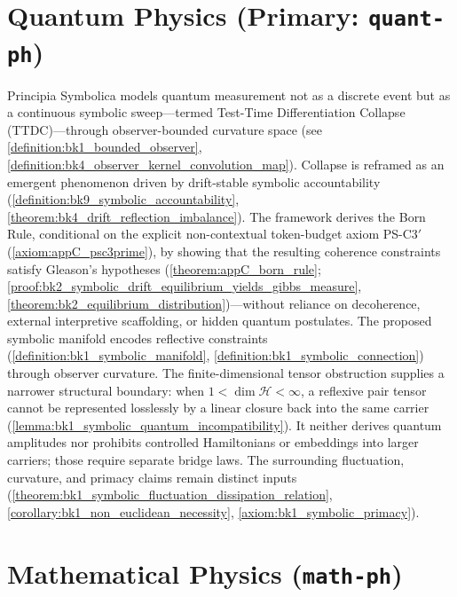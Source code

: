 \section*{Quantum Physics (Primary: \texttt{quant-ph})}
\label{sec:appE_quantum_physics}
Principia Symbolica models quantum measurement not as a discrete event but as a continuous symbolic sweep—termed Test-Time Differentiation Collapse (TTDC)—through observer-bounded curvature space (see \ref{definition:bk1_bounded_observer}, \ref{definition:bk4_observer_kernel_convolution_map}). Collapse is reframed as an emergent phenomenon driven by drift-stable symbolic accountability (\ref{definition:bk9_symbolic_accountability}, \ref{theorem:bk4_drift_reflection_imbalance}). The framework derives the Born Rule, conditional on the explicit non-contextual token-budget axiom PS-C3$'$ (\ref{axiom:appC_psc3prime}), by showing that the resulting coherence constraints satisfy Gleason's hypotheses (\ref{theorem:appC_born_rule}; \ref{proof:bk2_symbolic_drift_equilibrium_yields_gibbs_measure}, \ref{theorem:bk2_equilibrium_distribution})---without reliance on decoherence, external interpretive scaffolding, or hidden quantum postulates. The proposed symbolic manifold encodes reflective constraints (\ref{definition:bk1_symbolic_manifold}, \ref{definition:bk1_symbolic_connection}) through observer curvature.  The finite-dimensional tensor obstruction supplies a narrower structural boundary: when $1<\dim\mathcal H<\infty$, a reflexive pair tensor cannot be represented losslessly by a linear closure back into the same carrier (\ref{lemma:bk1_symbolic_quantum_incompatibility}).  It neither derives quantum amplitudes nor prohibits controlled Hamiltonians or embeddings into larger carriers; those require separate bridge laws.  The surrounding fluctuation, curvature, and primacy claims remain distinct inputs (\ref{theorem:bk1_symbolic_fluctuation_dissipation_relation}, \ref{corollary:bk1_non_euclidean_necessity}, \ref{axiom:bk1_symbolic_primacy}).

\section*{Mathematical Physics (\texttt{math-ph})}
\label{abs:mathphys}

